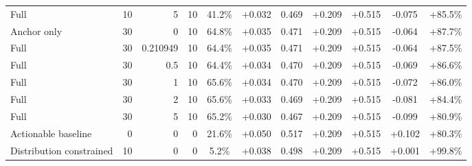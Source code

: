 \begin{table}[htbp]
\begin{tabular}{lrrrccccccc}
Full & 10 & 5 & 10 & 41.2\% & +0.032 & 0.469 & +0.209 & +0.515 & -0.075 & +85.5\% \\
Anchor only & 30 & 0 & 10 & 64.8\% & +0.035 & 0.471 & +0.209 & +0.515 & -0.064 & +87.7\% \\
Full & 30 & 0.210949 & 10 & 64.4\% & +0.035 & 0.471 & +0.209 & +0.515 & -0.064 & +87.5\% \\
Full & 30 & 0.5 & 10 & 64.4\% & +0.034 & 0.470 & +0.209 & +0.515 & -0.069 & +86.6\% \\
Full & 30 & 1 & 10 & 65.6\% & +0.034 & 0.470 & +0.209 & +0.515 & -0.072 & +86.0\% \\
Full & 30 & 2 & 10 & 65.6\% & +0.033 & 0.469 & +0.209 & +0.515 & -0.081 & +84.4\% \\
Full & 30 & 5 & 10 & 65.2\% & +0.030 & 0.467 & +0.209 & +0.515 & -0.099 & +80.9\% \\
Actionable baseline & 0 & 0 & 0 & 21.6\% & +0.050 & 0.517 & +0.209 & +0.515 & +0.102 & +80.3\% \\
Distribution constrained & 10 & 0 & 0 & 5.2\% & +0.038 & 0.498 & +0.209 & +0.515 & +0.001 & +99.8\% \\
\bottomrule
\end{tabular}
\end{table}